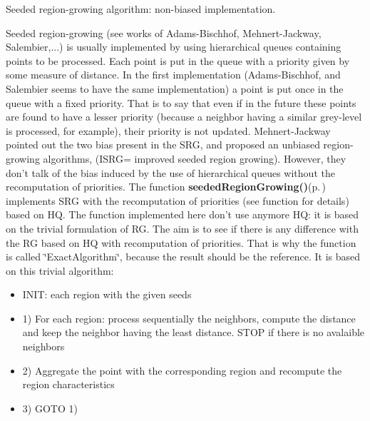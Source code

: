 Seeded region-growing algorithm: non-biased implementation. 

Seeded region-growing (see works of Adams-Bischhof, Mehnert-Jackway, Salembier,...) is usually implemented by using hierarchical queues containing points to be processed. Each point is put in the queue with a priority given by some measure of distance. In the first implementation (Adams-Bischhof, and Salembier seems to have the same implementation) a point is put once in the queue with a fixed priority. That is to say that even if in the future these points are found to have a lesser priority (because a neighbor having a similar grey-level is processed, for example), their priority is not updated. Mehnert-Jackway pointed out the two bias present in the SRG, and proposed an unbiased region-growing algorithms, (ISRG= improved seeded region growing). However, they don't talk of the bias induced by the use of hierarchical queues without the recomputation of priorities. The function {\bf seeded\-Region\-Growing()}{\rm (p.\,\pageref{group__regionGrowing_ga2})} implements SRG with the recomputation of priorities (see function for details) based on HQ. The function implemented here don't use anymore HQ: it is based on the trivial formulation of RG. The aim is to see if there is any difference with the RG based on HQ with recomputation of priorities. That is why the function is called \char`\"{}Exact\-Algorithm\char`\"{}, because the result should be the reference. It is based on this trivial algorithm: \begin{itemize}
\item INIT: each region with the given seeds \item 1) For each region: process sequentially the neighbors, compute the distance and keep the neighbor having the least distance. STOP if there is no avalaible neighbors \item 2) Aggregate the point with the corresponding region and recompute the region characteristics \item 3) GOTO 1)\end{itemize}
